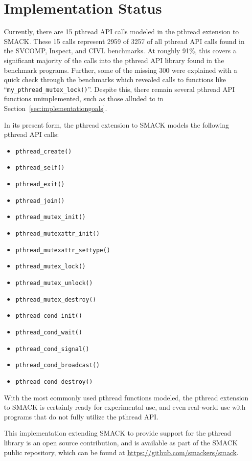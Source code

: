 \section{Implementation Status}
\label{sec:implementationstatus}
Currently, there are 15 pthread API calls modeled in the pthread
extension to SMACK.  These 15 calls represent 2959 of 3257 of all
pthread API calls found in the SVCOMP, Inspect, and CIVL
benchmarks. At roughly 91\%, this covers a significant majority of the
calls into the pthread API library found in the benchmark programs.
Further, some of the missing 300 were explained with a quick check
through the benchmarks which revealed calls to functions like
``\lstinline|my_pthread_mutex_lock()|''.  Despite this, there remain
several pthread API functions unimplemented, such as those alluded to
in Section~\ref{sec:implementationgoals}. 


In its present form, the pthread extension to SMACK models the
following pthread API calls:

\begin{multicols}{2}
\begin{itemize}
\item \lstinline|pthread_create()|
\item \lstinline|pthread_self()|
\item \lstinline|pthread_exit()|
\item \lstinline|pthread_join()|
\item \lstinline|pthread_mutex_init()|
\item \lstinline|pthread_mutexattr_init()|
\item \lstinline|pthread_mutexattr_settype()|
\item \lstinline|pthread_mutex_lock()|
\item \lstinline|pthread_mutex_unlock()|
\item \lstinline|pthread_mutex_destroy()|
\item \lstinline|pthread_cond_init()|
\item \lstinline|pthread_cond_wait()|
\item \lstinline|pthread_cond_signal()|
\item \lstinline|pthread_cond_broadcast()|
\item \lstinline|pthread_cond_destroy()|
\end{itemize}
\end{multicols}

With the most commonly used pthread functions modeled, the pthread
extension to SMACK is certainly ready for experimental use, and even
real-world use with programs that do not fully utilize the pthread
API. 

This implementation extending SMACK to provide support for the
pthread library is an open source contribution, and is available as
part of the SMACK public repository, which can be found at
\url{https://github.com/smackers/smack}.

